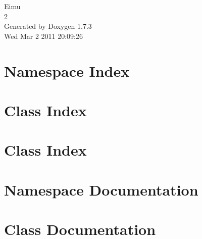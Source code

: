 \documentclass[a4paper]{book}
\begin{document}
\hypersetup{pageanchor=false}
\begin{titlepage}
\vspace*{7cm}
\begin{center}
{\Large Eimu \\[1ex]\large 2 }\\
\vspace*{1cm}
{\large Generated by Doxygen 1.7.3}\\
\vspace*{0.5cm}
{\small Wed Mar 2 2011 20:09:26}\\
\end{center}
\end{titlepage}
\clearemptydoublepage
{}
\tableofcontents
\clearemptydoublepage
{}
\hypersetup{pageanchor=true}
\chapter{Namespace Index}

\chapter{Class Index}

\chapter{Class Index}

\chapter{Namespace Documentation}








\chapter{Class Documentation}




















\printindex
\end{document}
